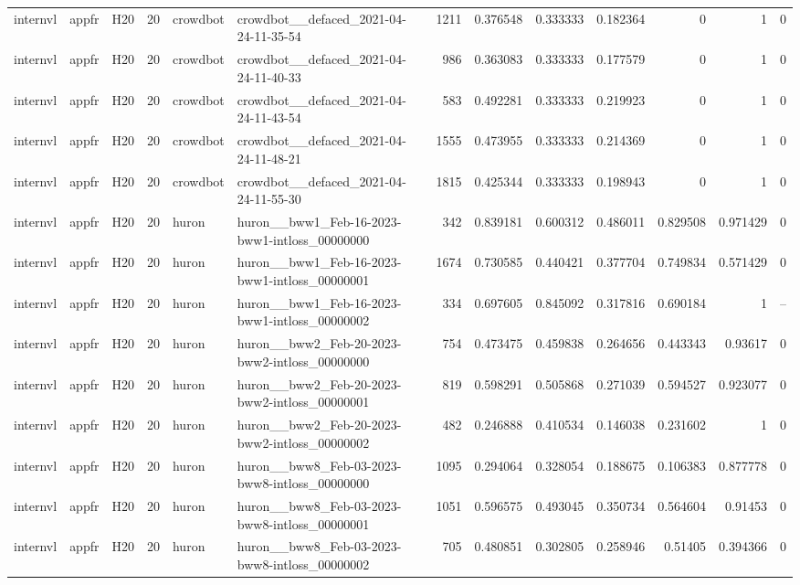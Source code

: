 \begin{longtable}{lllrllrrrrrrr}
internvl & appfr & H20 & 20 & crowdbot & crowdbot\_\_defaced\_2021-04-24-11-35-54 & 1211 & 0.376548 & 0.333333 & 0.182364 & 0 & 1 & 0 \\
internvl & appfr & H20 & 20 & crowdbot & crowdbot\_\_defaced\_2021-04-24-11-40-33 & 986 & 0.363083 & 0.333333 & 0.177579 & 0 & 1 & 0 \\
internvl & appfr & H20 & 20 & crowdbot & crowdbot\_\_defaced\_2021-04-24-11-43-54 & 583 & 0.492281 & 0.333333 & 0.219923 & 0 & 1 & 0 \\
internvl & appfr & H20 & 20 & crowdbot & crowdbot\_\_defaced\_2021-04-24-11-48-21 & 1555 & 0.473955 & 0.333333 & 0.214369 & 0 & 1 & 0 \\
internvl & appfr & H20 & 20 & crowdbot & crowdbot\_\_defaced\_2021-04-24-11-55-30 & 1815 & 0.425344 & 0.333333 & 0.198943 & 0 & 1 & 0 \\
internvl & appfr & H20 & 20 & huron & huron\_\_bww1\_Feb-16-2023-bww1-intloss\_00000000 & 342 & 0.839181 & 0.600312 & 0.486011 & 0.829508 & 0.971429 & 0 \\
internvl & appfr & H20 & 20 & huron & huron\_\_bww1\_Feb-16-2023-bww1-intloss\_00000001 & 1674 & 0.730585 & 0.440421 & 0.377704 & 0.749834 & 0.571429 & 0 \\
internvl & appfr & H20 & 20 & huron & huron\_\_bww1\_Feb-16-2023-bww1-intloss\_00000002 & 334 & 0.697605 & 0.845092 & 0.317816 & 0.690184 & 1 & -- \\
internvl & appfr & H20 & 20 & huron & huron\_\_bww2\_Feb-20-2023-bww2-intloss\_00000000 & 754 & 0.473475 & 0.459838 & 0.264656 & 0.443343 & 0.93617 & 0 \\
internvl & appfr & H20 & 20 & huron & huron\_\_bww2\_Feb-20-2023-bww2-intloss\_00000001 & 819 & 0.598291 & 0.505868 & 0.271039 & 0.594527 & 0.923077 & 0 \\
internvl & appfr & H20 & 20 & huron & huron\_\_bww2\_Feb-20-2023-bww2-intloss\_00000002 & 482 & 0.246888 & 0.410534 & 0.146038 & 0.231602 & 1 & 0 \\
internvl & appfr & H20 & 20 & huron & huron\_\_bww8\_Feb-03-2023-bww8-intloss\_00000000 & 1095 & 0.294064 & 0.328054 & 0.188675 & 0.106383 & 0.877778 & 0 \\
internvl & appfr & H20 & 20 & huron & huron\_\_bww8\_Feb-03-2023-bww8-intloss\_00000001 & 1051 & 0.596575 & 0.493045 & 0.350734 & 0.564604 & 0.91453 & 0 \\
internvl & appfr & H20 & 20 & huron & huron\_\_bww8\_Feb-03-2023-bww8-intloss\_00000002 & 705 & 0.480851 & 0.302805 & 0.258946 & 0.51405 & 0.394366 & 0 \\

\end{longtable}
